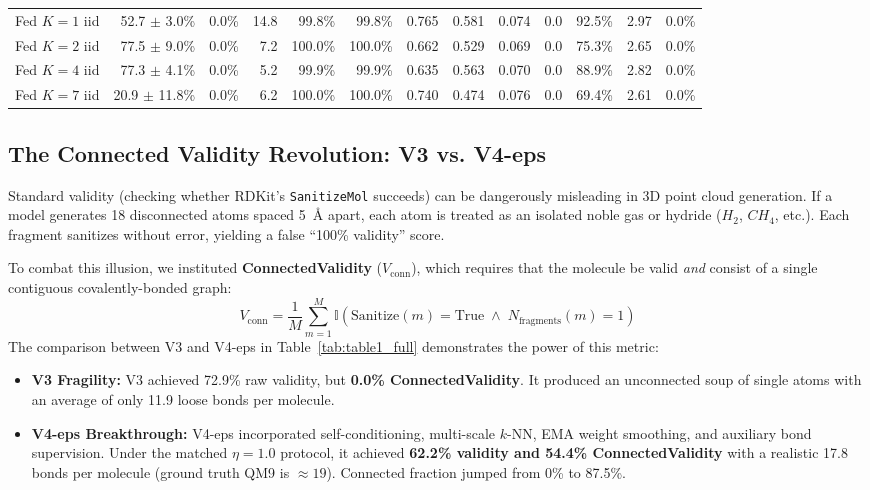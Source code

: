 \documentclass[12pt, a4paper]{article}
\begin{document}
\begin{table}[H]
{\begin{tabular}{lrrrrrrrrrrrr}
Fed $K=1$ iid & 52.7 $\pm$ 3.0\% & 0.0\% & 14.8 & 99.8\% & 99.8\% & 0.765 & 0.581 & 0.074 & 0.0 & 92.5\% & 2.97 & 0.0\% \\
Fed $K=2$ iid & 77.5 $\pm$ 9.0\% & 0.0\% & 7.2 & 100.0\% & 100.0\% & 0.662 & 0.529 & 0.069 & 0.0 & 75.3\% & 2.65 & 0.0\% \\
Fed $K=4$ iid & 77.3 $\pm$ 4.1\% & 0.0\% & 5.2 & 99.9\% & 99.9\% & 0.635 & 0.563 & 0.070 & 0.0 & 88.9\% & 2.82 & 0.0\% \\
Fed $K=7$ iid & 20.9 $\pm$ 11.8\% & 0.0\% & 6.2 & 100.0\% & 100.0\% & 0.740 & 0.474 & 0.076 & 0.0 & 69.4\% & 2.61 & 0.0\% \\
\bottomrule
\end{tabular}
}
\end{table}

\subsection{The Connected Validity Revolution: V3 vs. V4-eps}
Standard validity (checking whether RDKit's \texttt{SanitizeMol} succeeds) can be dangerously misleading in 3D point cloud generation. If a model generates 18 disconnected atoms spaced 5~\AA{} apart, each atom is treated as an isolated noble gas or hydride ($H_2$, $CH_4$, etc.). Each fragment sanitizes without error, yielding a false ``100\% validity'' score.

To combat this illusion, we instituted \textbf{ConnectedValidity} ($V_\text{conn}$), which requires that the molecule be valid \textit{and} consist of a single contiguous covalently-bonded graph:
\begin{equation}
    V_\text{conn} = \frac{1}{M} \sum_{m=1}^M \mathbb{I}\left(\text{Sanitize}(m) = \text{True} \;\land\; N_\text{fragments}(m) = 1\right)
\end{equation}
The comparison between V3 and V4-eps in Table~\ref{tab:table1_full} demonstrates the power of this metric:
\begin{itemize}[noitemsep]
    \item \textbf{V3 Fragility:} V3 achieved 72.9\% raw validity, but \textbf{0.0\% ConnectedValidity}. It produced an unconnected soup of single atoms with an average of only 11.9 loose bonds per molecule.
    \item \textbf{V4-eps Breakthrough:} V4-eps incorporated self-conditioning, multi-scale $k$-NN, EMA weight smoothing, and auxiliary bond supervision. Under the matched $\eta=1.0$ protocol, it achieved \textbf{62.2\% validity and 54.4\% ConnectedValidity} with a realistic 17.8 bonds per molecule (ground truth QM9 is $\approx 19$). Connected fraction jumped from 0\% to 87.5\%.
\end{itemize}
\end{document}
